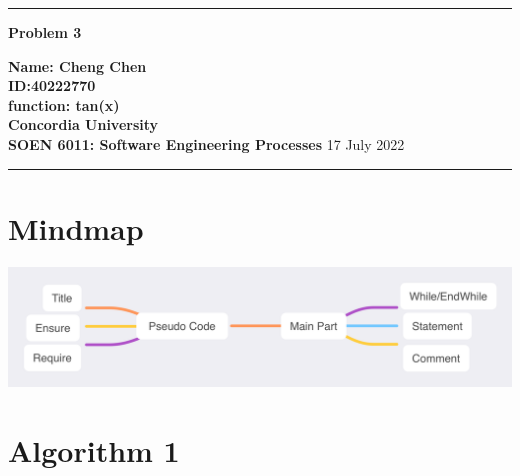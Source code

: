 \documentclass[10pt,a4paper,twoside]{article}
\begin{document}
\begin{center}
\hrule

\vspace{.4cm}
{\bf {\Huge Problem 3}}
\vspace{.2cm}
\end{center}
{\bf Name: Cheng Chen}  \\
{\bf ID:40222770}\\
{\bf function: tan(x)}\\
{\bf Concordia University}\\
{\bf SOEN 6011: Software Engineering Processes} {\bf  } \hspace{\fill}  17 July  2022 \\
\hrule






\section{Mindmap}
\includegraphics[scale=0.6]{problem3MindMap.png}

\section{Algorithm 1}
\end{document}
